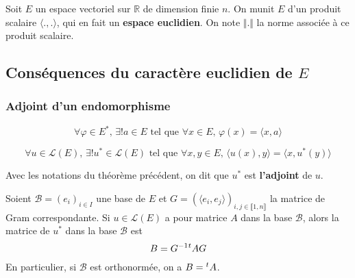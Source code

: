 




  Soit $E$ un espace vectoriel sur $\mathbb{R}$ de dimension finie $n$. On munit $E$ d'un produit scalaire $\langle . , . \rangle$, qui en fait un \textbf{espace euclidien}. On note $\Vert . \Vert$ la norme associée à ce produit scalaire.

  \subsection{Conséquences du caractère euclidien de \texorpdfstring{$E$}{E}}

  \subsubsection{Adjoint d'un endomorphisme}


  \begin{lemma}
    \[ \forall \varphi \in E^*, \, \exists! a \in E \text{ tel que } \forall x \in E, \, \varphi(x) = \langle x, a \rangle \]
  \end{lemma}

  \begin{theorem}
    \[ \forall u \in \mathcal{L}(E), \, \exists! u^* \in \mathcal{L}(E) \text{ tel que } \forall x, y \in E, \, \langle u(x), y \rangle = \langle x, u^*(y) \rangle \]
  \end{theorem}

  \begin{definition}
    Avec les notations du théorème précédent, on dit que $u^*$ est \textbf{l'adjoint} de $u$.
  \end{definition}

  \begin{theorem}
    Soient $\mathcal{B} = (e_i)_{i \in I}$ une base de $E$ et $G = (\langle e_i, e_j \rangle)_{i,j \in \llbracket 1, n \rrbracket}$ la matrice de Gram correspondante. Si $u \in \mathcal{L}(E)$ a pour matrice $A$ dans la base $\mathcal{B}$, alors la matrice de $u^*$ dans la base $\mathcal{B}$ est
    \[ B = G^{-1} \mathstrut ^t A G \]
    En particulier, si $\mathcal{B}$ est orthonormée, on a $B = \mathstrut ^t A$.
  \end{theorem}


